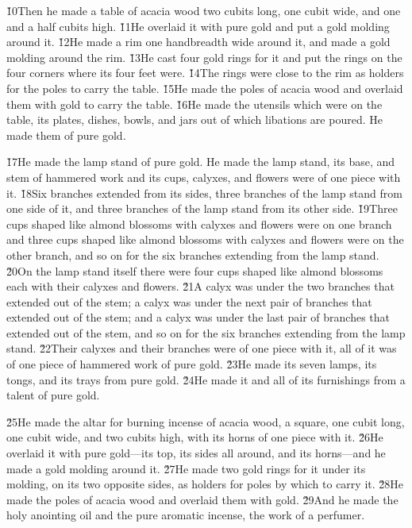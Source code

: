 \v{10}Then he made a table of acacia wood two cubits long, one cubit wide, and one and a half cubits high. \v{11}He overlaid it with pure gold and put a gold molding around it. \v{12}He made a rim one handbreadth wide around it, and made a gold molding around the rim. \v{13}He cast four gold rings for it and put the rings on the four corners where its four feet were. \v{14}The rings were close to the rim as holders for the poles to carry the table. \v{15}He made the poles of acacia wood and overlaid them with gold to carry the table. \v{16}He made the utensils which were on the table, its plates, dishes, bowls, and jars out of which libations are poured. He made them of pure gold.

\v{17}He made the lamp stand of pure gold. He made the lamp stand, its base, and stem of hammered work and its cups, calyxes, and flowers were of one piece with it. \v{18}Six branches extended from its sides, three branches of the lamp stand from one side of it, and three branches of the lamp stand from its other side. \v{19}Three cups shaped like almond blossoms with calyxes and flowers were on one branch and three cups shaped like almond blossoms with calyxes and flowers were on the other branch, and so on for the six branches extending from the lamp stand. \v{20}On the lamp stand itself there were four cups shaped like almond blossoms each with their calyxes and flowers. \v{21}A calyx was under the two branches that extended out of the stem; a calyx was under the next pair of branches that extended out of the stem; and a calyx was under the last pair of branches that extended out of the stem, and so on for the six branches extending from the lamp stand. \v{22}Their calyxes and their branches were of one piece with it, all of it was of one piece of hammered work of pure gold. \v{23}He made its seven lamps, its tongs, and its trays from pure gold. \v{24}He made it and all of its furnishings from a talent of pure gold.

\v{25}He made the altar for burning incense of acacia wood, a square, one cubit long, one cubit wide, and two cubits high, with its horns of one piece with it. \v{26}He overlaid it with pure gold---its top, its sides all around, and its horns---and he made a gold molding around it. \v{27}He made two gold rings for it under its molding, on its two opposite sides, as holders for poles by which to carry it. \v{28}He made the poles of acacia wood and overlaid them with gold. \v{29}And he made the holy anointing oil and the pure aromatic incense, the work of a perfumer.

